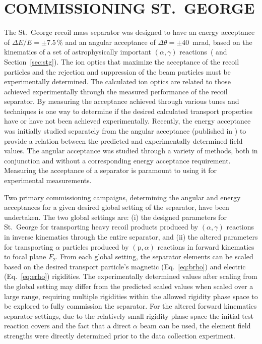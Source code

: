 \chapter{COMMISSIONING ST.\ GEORGE}

The St.\ George recoil mass separator was designed to have an energy acceptance
of $\Delta E/E = \pm7.5$\,\% and an angular acceptance of
$\Delta\theta = \pm40$~mrad, based on the kinematics of a set of
astrophysically important $(\alpha,\gamma)$ reactions~(\cite{Couder2008} and
Section~\ref{sec:stg}).
The ion optics that maximize the acceptance of the recoil particles and the
rejection and suppression of the beam particles must be experimentally
determined. The calculated ion optics are related to those achieved
experimentally through the measured performance of the recoil separator. By
measuring the acceptance achieved through various tunes and techniques is one
way to determine if the desired calculated transport properties have or have
not been achieved experimentally.
Recently, the energy acceptance was initially studied separately from the
angular acceptance (published in \cite{Meisel2017}) to provide a relation
between the predicted and experimentally determined field values. The angular
acceptance was studied through a variety of methods, both in conjunction and
without a corresponding energy acceptance requirement. Measuring the acceptance
of a separator is paramount to using it for experimental measurements.

Two primary commissioning campaigns, determining the angular and energy
acceptances for a given desired global setting of the separator, have been
undertaken. The two global settings are: (i) the designed parameters for St.\
George for transporting heavy recoil products produced by $(\alpha,\gamma)$
reactions in inverse kinematics through the entire separator, and (ii) the
altered parameters for transporting $\alpha$ particles produced by
$(\textrm{p},\alpha)$ reactions in forward kinematics to focal plane $F_2$.
From each global setting, the separator elements can be scaled based on the
desired transport particle's magnetic (Eq.~\ref{eq:brho}) and electric
(Eq.~\ref{eq:erho}) rigidities. The experimentally determined values after
scaling from the global setting may differ from the predicted scaled values
when scaled over a large range, requiring multiple rigidities within the
allowed rigidity phase space to be explored to fully commission the separator.
For the
altered forward kinematics separator settings, due to the relatively small
rigidity phase space the initial test reaction covers and the fact that a
direct $\alpha$ beam can be used, the element field strengths were directly
determined prior to the data collection experiment.

